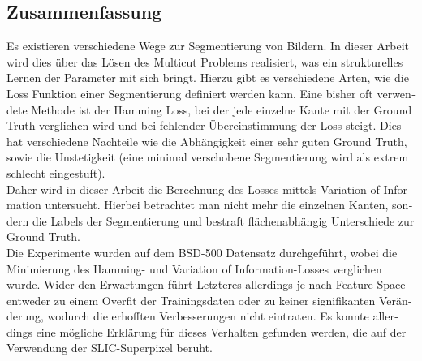 \begin{otherlanguage}{ngerman}
\chapter*{Zusammenfassung}
Es existieren verschiedene Wege zur Segmentierung von Bildern. In dieser Arbeit wird dies über das Lösen des Multicut Problems realisiert, was ein strukturelles Lernen der Parameter mit sich bringt. Hierzu gibt es verschiedene Arten, wie die Loss Funktion einer Segmentierung definiert werden kann. Eine bisher oft verwendete Methode ist der Hamming Loss, bei der jede einzelne Kante mit der Ground Truth verglichen wird und bei fehlender Übereinstimmung der Loss steigt. Dies hat verschiedene Nachteile wie die Abhängigkeit einer sehr guten Ground Truth, sowie die Unstetigkeit (eine minimal verschobene Segmentierung wird als extrem schlecht eingestuft). \\
Daher wird in dieser Arbeit die Berechnung des Losses mittels Variation of Information untersucht. Hierbei betrachtet man nicht mehr die einzelnen Kanten, sondern die Labels der Segmentierung und bestraft flächenabhängig Unterschiede zur Ground Truth. \\
Die Experimente wurden auf dem BSD-500 Datensatz durchgeführt, wobei die Minimierung des Hamming- und Variation of Information-Losses verglichen wurde. Wider den Erwartungen führt Letzteres allerdings je nach Feature Space entweder zu einem Overfit der Trainingsdaten oder zu keiner signifikanten Veränderung, wodurch die erhofften Verbesserungen nicht eintraten. Es konnte allerdings eine mögliche Erklärung für dieses Verhalten gefunden werden, die auf der Verwendung der SLIC-Superpixel beruht.

\end{otherlanguage}

\endgroup			

\vfill